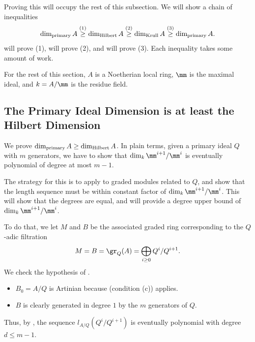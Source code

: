Proving this will occupy the rest of this subsection.
We will show a chain of inequalities
$$\dim_{\text{primary}} A \stackrel{\text{(1)}}\geq \dim_{\text{Hilbert}} A 
\stackrel{\text{(2)}}\geq \dim_{\text{Krull}} A 
\stackrel{\text{(3)}}\geq \dim_{\text{primary}} A.$$
 will prove (1),
 will prove (2),
and  will prove (3).
Each inequality takes some amount of work.

For the rest of this section,
$A$ is a Noetherian local ring, $\mm$ is the maximal ideal,
and $k=A/\mm$ is the residue field.

\subsection{The Primary Ideal Dimension is at least the Hilbert Dimension}
\label{subsec:dimP_dimH}
We prove $\dim_{\text{primary}} A\geq \dim_{\text{Hilbert}} A$. 
In plain terms, given a primary ideal $Q$
with $m$ generators, we have to show that 
$\dim_k \mm^{i+1}/\mm^i$ is eventually polynomial
of degree at most $m-1$.

The strategy for this is to apply 
 to graded modules 
related to $Q$, and show that the length sequence
must be within constant factor of $\dim_k \mm^{i+1}/\mm^i$.
This will show that the degrees are equal,
and will provide a degree upper bound of
$\dim_k \mm^{i+1}/\mm^i$.



To do that, we let $M$ and $B$ be the associated graded ring
corresponding to the $Q$-adic filtration
$$M=B=\gr_Q(A)=\bigoplus_{i\geq 0} Q^i / Q^{i+1}.$$
We check the hypothesis of .
\begin{itemize}
    \item $B_0 = A/Q$ is Artinian because  
    (condition (c)) applies.
    \item $B$ is clearly generated in degree $1$
    by the $m$ generators of $Q$.
\end{itemize}
Thus, by , the sequence
$l_{A/Q}(Q^i/Q^{i+1})$ is eventually polynomial
with degree $d\leq m-1$.

